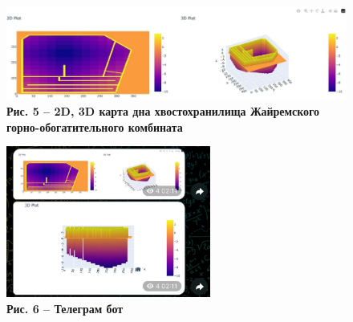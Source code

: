\begin{figure}[H]
	\centering
	\includegraphics[width=1\textwidth]{assets/212}
	\caption*{\bfseries Рис. 5 -- 2D, 3D карта дна хвостохранилища Жайремского
  горно-обогатительного комбината}
\end{figure}



\begin{figure}[H]
	\centering
	\includegraphics[width=0.6\textwidth]{assets/213}
	\caption*{\bfseries Рис. 6 -- Телеграм бот}
\end{figure}


